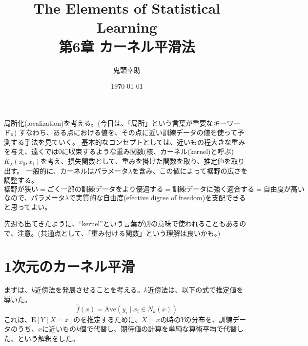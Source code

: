 \documentclass[uplatex]{jsarticle}
\title{The Elements of Statistical Learning \\ 第6章 カーネル平滑法}
\author{鬼頭幸助}
\date{\today}
\begin{document}
\maketitle

局所化(localization)を考える。(今日は、「局所」という言葉が重要なキーワード。)
すなわち、ある点における値を、その点に近い訓練データの値を使って予測する手法を見ていく。
基本的なコンセプトとしては、近いもの程大きな重みを与え、遠くでは0に収束するような重み関数(核、カーネル(kernel)と呼ぶ)$K_{\lambda}(x_{0}, x_{i})$を考え、損失関数として、重みを掛けた関数を取り、推定値を取り出す。
一般的に、カーネルはパラメータ$\lambda$を含み、この値によって裾野の広さを調整する。
\[
  \mbox{裾野が狭い}=\mbox{ごく一部の訓練データをより優遇する}=\mbox{訓練データに強く適合する}=\mbox{自由度が高い}
\]
なので、パラメータ$\lambda$で実質的な自由度(efective digree of freedom)を支配できると思ってよい。

先週も出てきたように、``kernel''という言葉が別の意味で使われることもあるので、注意。(共通点として、「重み付ける関数」という理解は良いかも。)

\section{1次元のカーネル平滑}
まずは、$k$近傍法を発展させることを考える。$k$近傍法は、以下の式で推定値を導いた。
\[
  \hat{f}(x)=\mathrm{Ave}(y_{i} \mid x_{i} \in N_{k}(x))
\]
これは、$\mathrm{E}[Y \mid X=x]$のを推定するために、$X=x$の時の$Y$の分布を、訓練データのうち、$x$に近いもの$k$個で代替し、期待値の計算を単純な算術平均で代替した、という解釈をした。
\end{document}
